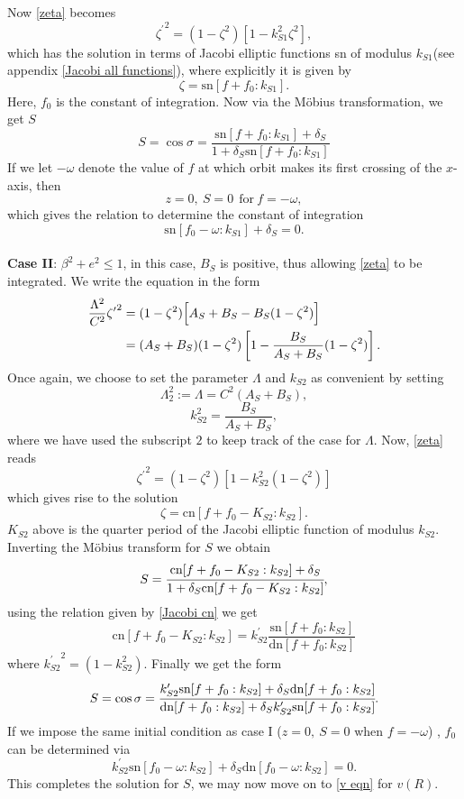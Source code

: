 \documentclass[12pt,oneside]{report}
\theoremstyle{definition}
\begin{document}
Now \autoref{zeta} becomes
\begin{equation}
    {\zeta^{\prime}}^{2} = (1-\zeta^{2})[1-k_{S1}^{2}\zeta^{2}],
\end{equation}
which has the solution in terms of Jacobi elliptic functions sn of modulus $k_{S1}$(see appendix \ref{Jacobi all functions}), where explicitly it is given by
$$ \zeta = \text{sn}[f+f_{0}:k_{S1}].$$
Here, $f_{0}$ is the constant of integration. Now via the Möbius transformation, we get $S$
$$ S = \cos{\sigma} =  \frac{\text{sn}[f+f_{0}:k_{S1}]+\delta_{S}}{1+\delta_{S}\text{sn}[f+f_{0}:k_{S1}]}$$
If we let $-\omega$ denote the value of $f$ at which orbit makes its first crossing of the $x$-axis, then 
$$ z= 0 , \ S= 0 \ \ \text{for} \  f = -\omega,$$
which gives the relation to determine the constant of integration
$$ \text{sn}[f_{0}-\omega:k_{S1}]+\delta_{S} = 0.$$
\\
\textbf{Case II}: $\beta^{2}+e^{2} \leq 1$,
in this case, $B_{S}$ is positive, thus allowing \autoref{zeta} to be integrated. We write the equation in the form
\begin{align}
\frac{\Lambda^{2}}{C^{2}}{\zeta^{\prime}}^{2} 
  &= (1-\zeta^{2})\Bigl[A_{S}+B_{S}-B_{S}(1-\zeta^{2})\Bigr] \\
  &= (A_{S}+B_{S})(1-\zeta^{2})\left[ 1 - \frac{B_{S}}{A_{S}+B_{S}}(1-\zeta^{2})\right].
\end{align}
Once again, we choose to set the parameter $\Lambda$ and $k_{S2}$ as convenient by setting
$$ \Lambda_{2}^{2} := \Lambda = C^{2}(A_{S}+B_{S}), $$
$$k_{S2}^{2} = \frac{B_{S}}{A_{S}+B_{S}},$$
where we have used the subscript $2$ to keep track of the case for $\Lambda$. Now,  \autoref{zeta} reads
$$ {\zeta^{\prime}}^{2} = (1-\zeta^{2})[1-k_{S2}^{2}(1-\zeta^{2})]$$
which gives rise to the solution
\begin{equation}
    \zeta = \text{cn}[f+f_{0}-K_{S2}:k_{S2}].
\end{equation}
  $K_{S2}$ above is the quarter period of the Jacobi elliptic function of modulus $k_{S2}$. Inverting the Möbius transform for $S$ we obtain
$$ S = \cfrac{\text{cn}[f+f_{0}-K_{S2}:k_{S2}] + \delta_{S}}{1+\delta_{S}\text{cn}[f+f_{0}-K_{S2}:k_{S2}]},$$
using the relation given by \autoref{Jacobi cn} we get
$$ \text{cn}[f+f_{0}-K_{S2}:k_{S2}] = k_{S2}^{\prime}\frac{\text{sn}[f+f_{0}:k_{S2}]}{\text{dn}[f+f_{0}:k_{S2}]}$$
where ${k_{S2}^{\prime}}^{2} = (1-k_{S2}^{2})$.
Finally we get the form
\begin{equation}
    S = \cos{\sigma} = \cfrac{k_{S2}^{\prime} \text{sn}[f+f_{0}:k_{S2}] + \delta_{S} \text{dn}[f+f_{0}:k_{S2}]}
    {\text{dn}[f+f_{0}:k_{S2}] + \delta_{S} k_{S2}^{\prime} \text{sn}[f+f_{0}:k_{S2}]}.
\end{equation}
If we impose the same initial condition as case I ($ z= 0, \  S = 0 $ when $f = -\omega$)
, $f_{0}$ can be determined via
$$ k_{S2}^{\prime} \text{sn}[f_{0}-\omega:k_{S2}]+\delta_{S}\text{dn}[f_{0}-\omega:k_{S2}] = 0.$$
This completes the solution for $S$, we may now move on to \autoref{v eqn} for $v(R)$.
\end{document}
